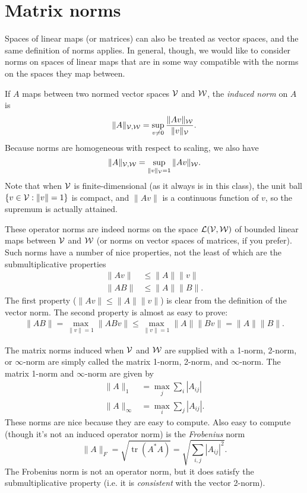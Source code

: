 \documentclass[12pt, leqno]{article}
\begin{document}
\section*{Matrix norms}

Spaces of linear maps (or matrices) can also be treated as
vector spaces, and the same definition of norms applies.  In general,
though, we would like to consider norms on spaces of linear maps that
are in some way compatible with the norms on the spaces they map
between.

If $A$ maps between two normed vector spaces $\mathcal{V}$ and $\mathcal{W}$,
the {\em induced norm} on $A$ is
\[
  \|A\|_{\mathcal{V},\mathcal{W}} = \sup_{v \neq 0} \frac{ \|Av\|_{\mathcal{W}} }{ \|v\|_{\mathcal{V}} }.
\]
Because norms are homogeneous with respect to scaling, we also have
\[
  \|A\|_{\mathcal{V},\mathcal{W}} = \sup_{\|v\|_{\mathcal{V}} = 1} \|Av\|_{\mathcal{W}}.
\]
Note that when $\mathcal{V}$ is finite-dimensional (as it always is in this
class), the unit ball $\{v \in \mathcal{V} : \|v\| = 1\}$ is compact, and
$\|Av\|$ is a continuous function of $v$, so the supremum is actually
attained.

These operator norms are indeed norms on the space $\mathcal{L}(\mathcal{V},
\mathcal{W})$ of bounded linear maps between $\mathcal{V}$ and $\mathcal{W}$ (or norms
on vector spaces of matrices, if you prefer).
Such norms have a number of nice properties, not the least of
which are the submultiplicative properties
\begin{align*}
  \|Av\| & \leq \|A\| \|v\| \\
  \|AB\| & \leq \|A\| \|B\|.
\end{align*}
The first property ($\|Av\| \leq \|A\| \|v\|$) is clear from the
definition of the vector norm.  The second property is almost as easy
to prove:
\begin{align*}
  \|AB\| =    \max_{\|v\| = 1} \|ABv\| 
         \leq \max_{\|v\| = 1} \|A\| \|Bv\|
         = \|A\| \|B\|.
\end{align*}

The matrix norms induced when $\mathcal{V}$ and $\mathcal{W}$ are supplied with a 1-norm,
2-norm, or $\infty$-norm are simply called the matrix 1-norm, 2-norm,
and $\infty$-norm.  The matrix 1-norm and $\infty$-norm are given by
\begin{align*}
  \|A\|_1       &= \max_{j} \sum_{i} |A_{ij}| \\
  \|A\|_{\infty} &= \max_{i} \sum_{j} |A_{ij}|.
\end{align*}
These norms are nice because they are easy to compute.  Also easy to
compute (though it's not an induced operator norm) is the {\em Frobenius}
norm
\[
  \|A\|_F = \sqrt{\operatorname{tr}(A^*A)} = \sqrt{\sum_{i,j} |A_{ij}|^2}.
\]
The Frobenius norm is not an operator norm, but it does satisfy the
submultiplicative property (i.e. it is {\em consistent} with the
vector 2-norm).
\end{document}
